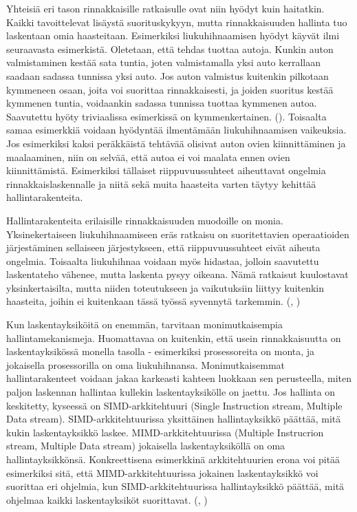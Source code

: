 Yhteisiä eri tason rinnakkaisille ratkaisulle ovat niin hyödyt kuin haitatkin.
Kaikki tavoittelevat lisäystä suorituskykyyn, mutta rinnakkaisuuden
hallinta tuo laskentaan omia haasteitaan. Esimerkiksi liukuhihnaamisen hyödyt
käyvät ilmi seuraavasta esimerkistä. Oletetaan, että tehdas tuottaa autoja.
Kunkin auton valmistaminen kestää sata tuntia, joten valmistamalla yksi auto
kerrallaan saadaan sadassa tunnissa yksi auto. Jos auton valmistus kuitenkin
pilkotaan kymmeneen osaan, joita voi suorittaa rinnakkaisesti, ja joiden
suoritus kestää kymmenen tuntia, voidaankin sadassa tunnissa tuottaa kymmenen
autoa. Saavutettu hyöty triviaalissa esimerkissä on kymmenkertainen.
(\citealt{intro}). Toisaalta samaa esimerkkiä voidaan hyödyntää ilmentämään
liukuhihnaamisen vaikeuksia. Jos esimerkiksi kaksi peräkkäistä tehtävää
olisivat auton ovien kiinnittäminen ja maalaaminen, niin on selvää, että autoa
ei voi maalata ennen ovien kiinnittämistä. Esimerkiksi tällaiset
riippuvuussuhteet aiheuttavat ongelmia rinnakkaislaskennalle ja niitä sekä
muita haasteita varten täytyy kehittää hallintarakenteita.

Hallintarakenteita erilaisille rinnakkaisuuden muodoille on monia.
Yksinekertaiseen liukuhihnaamiseen eräs ratkaisu on suoritettavien operaatioiden
järjestäminen sellaiseen järjestykseen, että riippuvuussuhteet eivät
aiheuta ongelmia. Toisaalta liukuhihnaa voidaan myös hidastaa, jolloin
saavutettu laskentateho vähenee, mutta laskenta pysyy oikeana. Nämä
ratkaisut kuulostavat yksinkertaisilta, mutta niiden toteutukseen ja
vaikutuksiin liittyy kuitenkin haasteita, joihin ei kuitenkaan tässä työssä
syvennytä tarkemmin. (\citealt{intro}, \citealt{rauber})

Kun laskentayksiköitä on enemmän, tarvitaan monimutkaisempia
hallintamekanismeja. Huomattavaa on kuitenkin, että usein rinnakkaisuutta on
laskentayksikössä monella tasolla - esimerkiksi prosessoreita on monta, ja
jokaisella prosessorilla on oma liukuhihnansa. Monimutkaisemmat
hallintarakenteet voidaan jakaa karkeasti kahteen luokkaan sen perusteella,
miten paljon laskennan hallintaa kullekin laskentayksikölle on jaettu. Jos
hallinta on keskitetty, kyseessä on SIMD-arkkitehtuuri (Single Instruction
stream, Multiple Data stream). SIMD-arkkitehtuurissa yksittäinen
hallintayksikkö päättää, mitä kukin laskentayksikkö laskee.
MIMD-arkkitehtuurissa (Multiple Instrucrion stream, Multiple Data stream)
jokaisella laskentayksiköllä on oma hallintayksikkönsä. Konkreettisena
esimerkkinä arkkitehtuurien erona voi pitää esimerkiksi sitä, että
MIMD-arkkitehtuurissa jokainen laskentayksikkö voi suorittaa eri ohjelmia, kun
SIMD-arkkitehtuurissa hallintayksikkö päättää, mitä ohjelmaa kaikki
laskentayksiköt suorittavat. (\citealt{intro}, \citealt{rauber})

